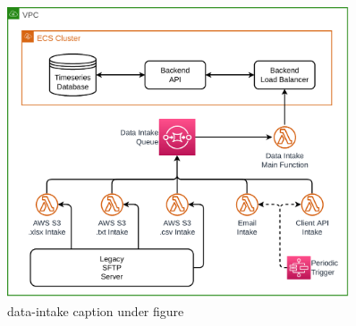 \begin{figure}[!htbp]
    \centering
    \includegraphics[width=0.90\textwidth]{img/diagrams/pdf/data-intake.drawio.pdf}
    \caption[data-intake listing]{data-intake caption under figure}
    \label{fig:data-intake}
\end{figure}
